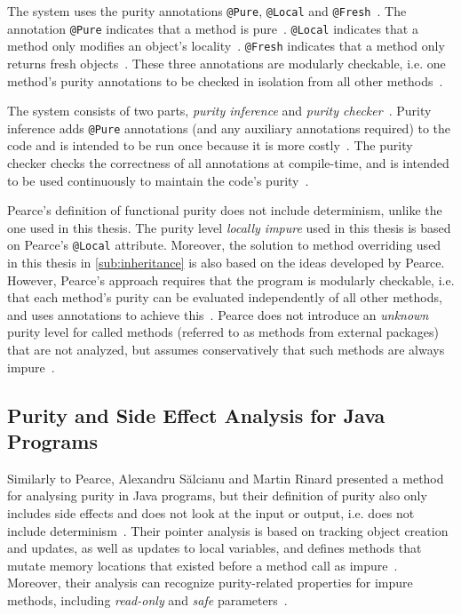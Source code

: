 \documentclass[a4paper,12pt]{article}
\begin{document}
The system uses the purity annotations \texttt{@Pure}, \texttt{@Local} and \texttt{@Fresh}~\cite{pearce2011jpure}. The annotation \texttt{@Pure} indicates that a method is pure~\cite{pearce2011jpure}. \texttt{@Local} indicates that a method only modifies an object's locality~\cite{pearce2011jpure}. \texttt{@Fresh} indicates that a method only returns fresh objects~\cite{pearce2011jpure}. These three annotations are modularly checkable, i.e. one method's purity annotations to be checked in isolation from all other methods~\cite{pearce2011jpure}.

The system consists of two parts, \textit{purity inference} and \textit{purity checker}~\cite{pearce2011jpure}. Purity inference adds \texttt{@Pure} annotations (and any auxiliary annotations required) to the code and is intended to be run once because it is more costly~\cite{pearce2011jpure}. The purity checker checks the correctness of all annotations at compile-time, and is intended to be used continuously to maintain the code's purity~\cite{pearce2011jpure}.

Pearce's definition of functional purity does not include determinism, unlike the one used in this thesis. The purity level \textit{locally impure} used in this thesis is based on Pearce's \texttt{@Local} attribute. Moreover, the solution to method overriding used in this thesis in \autoref{sub:inheritance} is also based on the ideas developed by Pearce. However, Pearce's approach requires that the program is modularly checkable, i.e. that each method's purity can be evaluated independently of all other methods, and uses annotations to achieve this~\cite{pearce2011jpure}.  Pearce does not introduce an \textit{unknown} purity level for called methods (referred to as methods from external packages) that are not analyzed, but assumes conservatively that such methods are always impure~\cite{pearce2011jpure}.


\subsection{Purity and Side Effect Analysis for Java Programs} \label{sub:Purity and Side Effect Analysis for Java Programs}

Similarly to Pearce, Alexandru S\u{a}lcianu and Martin Rinard presented a method for analysing purity in Java programs, but their definition of purity also only includes side effects and does not look at the input or output, i.e. does not include determinism~\cite{salcianu}. Their pointer analysis is based on tracking object creation and updates, as well as updates to local variables, and defines methods that mutate memory locations that existed before a method call as impure~\cite{salcianu}. Moreover, their analysis can recognize purity-related properties for impure methods, including \textit{read-only} and \textit{safe} parameters~\cite{salcianu}.
\end{document}

